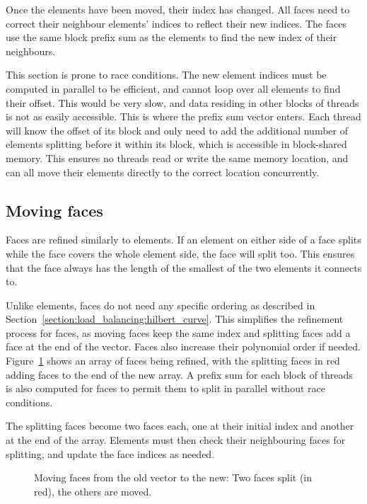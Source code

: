 Once the elements have been moved, their index has changed. All faces need to correct their
neighbour elements' indices to reflect their new indices. The faces use the same block prefix sum as
the elements to find the new index of their neighbours.

This section is prone to race conditions. The new element indices must be computed in parallel to be
efficient, and cannot loop over all elements to find their offset. This would be very slow, and data
residing in other blocks of threads is not as easily accessible. This is where the prefix sum vector
enters. Each thread will know the offset of its block and only need to add the additional number of
elements splitting before it within its block, which is accessible in block-shared memory. This
ensures no threads read or write the same memory location, and can all move their elements directly
to the correct location concurrently.

\subsection{Moving faces}\label{subsection:adaptive_mesh_refinement:implementation:moving_faces}

Faces are refined similarly to elements. If an element on either side of a face splits while the
face covers the whole element side, the face will split too. This ensures that the face always has
the length of the smallest of the two elements it connects to.

Unlike elements, faces do not need any specific ordering as described in
Section~\ref{section:load_balancing:hilbert_curve}. This simplifies the refinement process for
faces, as moving faces keep the same index and splitting faces add a face at the end of the vector.
Faces also increase their polynomial order if needed. Figure~\ref{fig:refinement_offset_face} shows
an array of faces being refined, with the splitting faces in red adding faces to the end of the new
array. A prefix sum for each block of threads is also computed for faces to permit them to split in
parallel without race conditions.

The splitting faces become two faces each, one at their initial index and another at the end of the
array. Elements must then check their neighbouring faces for splitting, and update the face indices
as needed.

\begin{figure}[H]
    \centering
    
    \caption{Moving faces from the old vector to the new: Two faces split (in red), the others are moved.}\label{fig:refinement_offset_face}
\end{figure}
